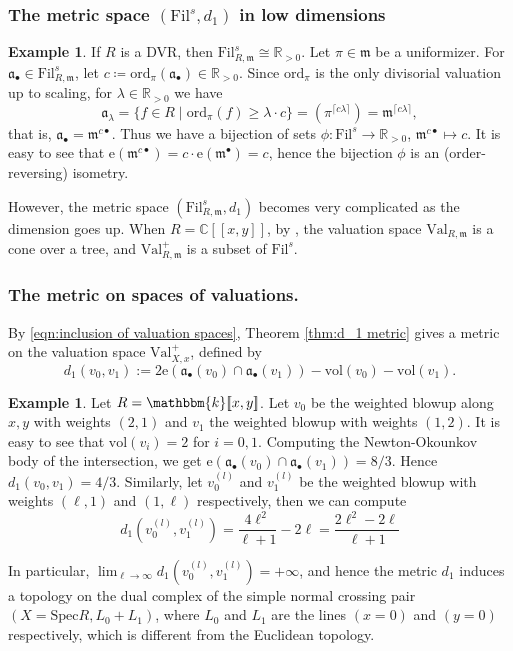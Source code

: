 \documentclass[11pt, leqno]{amsart}%
\theoremstyle{plain}
\theoremstyle{definition}
\newtheorem{example}[theorem]{Example}
\theoremstyle{remark}
\newcommand{\bC}{\mathbb{C}}
\newcommand{\bR}{\mathbb{R}}
\newcommand{\fa}{\mathfrak{a}}
\newcommand{\fm}{\mathfrak{m}}
\newcommand{\vol}{\mathrm{vol}}
\newcommand{\ord}{\mathrm{ord}}
\newcommand{\Val}{\mathrm{Val}}
\newcommand{\Spec}{\mathrm{Spec}}
\newcommand{\supl}{^{(l)}}
\newcommand{\bk}{\mathbbm{k}}
\newcommand{\e}{\mathrm{e}}
\newcommand{\Fil}{\mathrm{Fil}}
\numberwithin{equation}{section}
\begin{document}
\subsubsection{The metric space $(\Fil^s,d_1)$ in low dimensions}

\begin{example}\label{eg:DVR}
    If $R$ is a DVR, then $\Fil^s_{R,\fm}\cong \bR_{>0}$. Let $\pi\in\fm$ be a uniformizer. For $\fa_\bullet\in\Fil^s_{R,\fm}$, let $c\coloneqq \ord_\pi(\fa_\bullet)\in\bR_{>0}$. Since $\ord_\pi$ is the only divisorial valuation up to scaling, for $\lambda\in\bR_{>0}$ we have
    \[
        \fa_\lambda=\{f\in R\mid \ord_\pi(f)\ge \lambda\cdot c\}=(\pi^{\lceil c\lambda\rceil})=\fm^{\lceil c\lambda\rceil},
    \]
    that is, $\fa_\bullet=\fm^{c\bullet}$. Thus we have a bijection of sets $\phi:\Fil^s\to\bR_{>0}$, $\fm^{c\bullet}\mapsto c$. It is easy to see that $\e(\fm^{c\bullet})=c\cdot\e(\fm^\bullet)=c$, hence the bijection $\phi$ is an (order-reversing) isometry. 
\end{example}

However, the metric space $(\Fil^s_{R,\fm},d_1)$ becomes very complicated as the dimension goes up. When $R=\bC[\![x,y]\!]$, by \cite{FJ04}, the valuation space $\Val_{R,\fm}$ is a cone over a tree, and $\Val^+_{R,\fm}$ is a subset of $\Fil^s$.




\subsubsection{The metric on spaces of valuations.}
By \eqref{eqn:inclusion of valuation spaces}, Theorem \ref{thm:d_1 metric} gives a metric on the valuation space $\Val^+_{X,x}$, defined by
\[
d_1(v_0,v_1):= 2\e(\fa_\bullet(v_0)\cap\fa_\bullet(v_1))-\vol(v_0)-\vol(v_1).
\]

\begin{example}
    Let $R=\bk[\![x,y]\!]$. Let $v_0$ be the weighted blowup along $x,y$ with weights $(2,1)$ and $v_1$ the weighted blowup with weights $(1,2)$. It is easy to see that $\vol(v_i)=2$ for $i=0,1$. Computing the Newton-Okounkov body of the intersection, we get $\e(\fa_\bullet(v_0)\cap\fa_\bullet(v_1))=8/3$. Hence $d_1(v_0,v_1)=4/3$. Similarly, let $v_0\supl$ and $v_1\supl$ be the weighted blowup with weights $(\ell,1)$ and $(1,\ell)$ respectively, then we can compute
    \[
        d_1(v_0\supl,v_1\supl)=\frac{4\ell^2}{\ell+1}-2\ell=\frac{2\ell^2-2\ell}{\ell+1}
    \]
	
    In particular, $\lim_{\ell\to\infty}d_1(v_0\supl,v_1\supl)=+\infty$, and hence the metric $d_1$ induces a topology on the dual complex of the simple normal crossing pair $(X=\Spec R,L_0+L_1)$, where $L_0$ and $L_1$ are the lines $(x=0)$ and $(y=0)$ respectively, which is different from the Euclidean topology.
\end{example}
\end{document}
